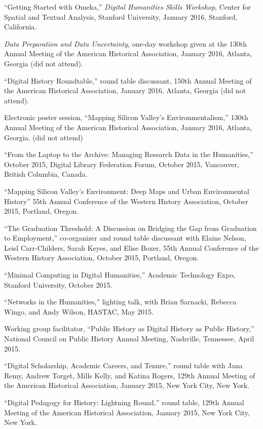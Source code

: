 ``Getting Started with Omeka,'' \emph{Digital Humanities Skills
Workshop}, Center for Spatial and Textual Analysis, Stanford University,
January 2016, Stanford, California.

\emph{Data Preparation and Data Uncertainty}, one-day workshop given at
the 130th Annual Meeting of the American Historical Association, January
2016, Atlanta, Georgia (did not attend).

``Digital History Roundtable,'' round table discussant, 150th Annual
Meeting of the American Historical Association, January 2016, Atlanta,
Georgia (did not attend).

Electronic poster session, ``Mapping Silicon Valley's
Environmentalism,'' 130th Annual Meeting of the American Historical
Association, January 2016, Atlanta, Georgia. (did not attend)

``From the Laptop to the Archive: Managing Research Data in the
Humanities,'' October 2015, Digital Library Federation Forum, October
2015, Vancouver, British Columbia, Canada.

``Mapping Silicon Valley's Environment: Deep Maps and Urban
Environmental History'' 55th Annual Conference of the Western History
Association, October 2015, Portland, Oregon.

``The Graduation Threshold: A Discussion on Bridging the Gap from
Graduation to Employment,'' co-organizer and round table discussant with
Elaine Nelson, Leisl Carr-Childers, Sarah Keyes, and Elise Boxer, 55th
Annual Conference of the Western History Association, October 2015,
Portland, Oregon.

``Minimal Computing in Digital Humanities,'' Academic Technology Expo,
Stanford University, October 2015.

``Networks in the Humanities,'' lighting talk, with Brian Sarnacki,
Rebecca Wingo, and Andy Wilson, HASTAC, May 2015.

Working group facilitator, ``Public History as Digital History as Public
History,'' National Council on Public History Annual Meeting, Nashville,
Tennessee, April 2015.

``Digital Scholarship, Academic Careers, and Tenure,'' round table with
Jana Remy, Andrew Torget, Mills Kelly, and Katina Rogers, 129th Annual
Meeting of the American Historical Association, January 2015, New York
City, New York.

``Digital Pedagogy for History: Lightning Round,'' round table, 129th
Annual Meeting of the American Historical Association, January 2015, New
York City, New York.

